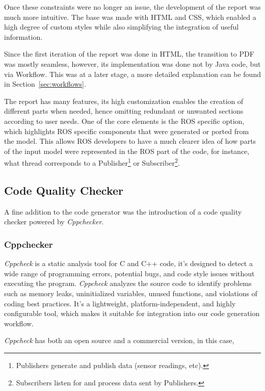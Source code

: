 Once these constraints were no longer an issue, the development of the report was much more intuitive. The base was made with \gls{HTML} and \gls{CSS}, which enabled a high degree of custom styles while also simplifying the integration of useful information. 

Since the first iteration of the report was done in \gls{HTML}, the transition to PDF was mostly seamless, however, its implementation was done not by Java code, but via Workflow. This was at a later stage, a more detailed explanation can be found in Section~\ref{sec:workflows}.

The report has many features, its high customization enables the creation of different parts when needed, hence omitting redundant or unwanted sections according to user needs. One of the core elements is the \gls{ROS} specific option, which highlights \gls{ROS} specific components that were generated or ported from the model. This allows \gls{ROS} developers to have a much clearer idea of how parts of the input model were represented in the \gls{ROS} part of the code, for instance, what thread corresponds to a Publisher\footnote{Publishers generate and publish data (sensor readings, etc).} or Subscriber\footnote{Subscribers listen for and process data sent by Publishers.}.

\subsection{Code Quality Checker}
\label{sec:impl_code_qual_checker}

A fine addition to the code generator was the introduction of a code quality checker powered by \textit{Cppchecker}.

\subsubsection{Cppchecker}
\label{sec:impl_side_cppchecker}

\textit{Cppcheck} is a static analysis tool for C and C++ code, it's designed to detect a wide range of programming errors, potential bugs, and code style issues without executing the program. \textit{Cppcheck} analyzes the source code to identify problems such as memory leaks, uninitialized variables, unused functions, and violations of coding best practices. It's a lightweight, platform-independent, and highly configurable tool, which makes it suitable for integration into our code generation workflow.

\textit{Cppcheck} has both an open source and a commercial version, in this case, 

